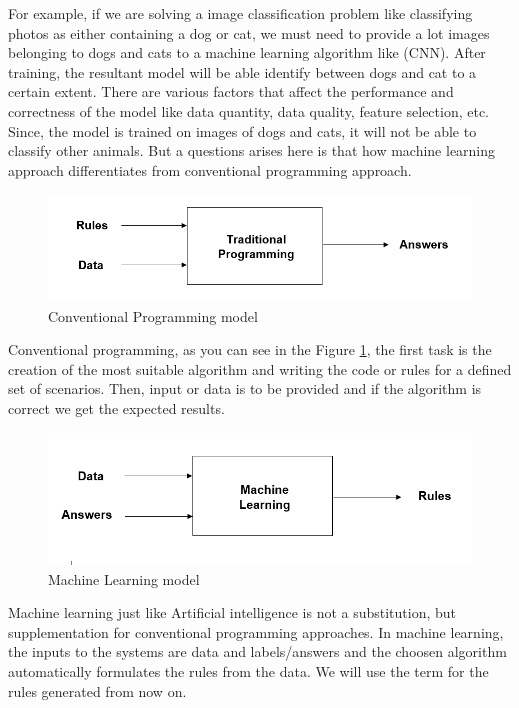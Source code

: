 For example, if we are solving a image classification problem like classifying photos as either containing a dog or cat, we must need to provide a lot images belonging to dogs and cats to a machine learning algorithm like (CNN). After training, the resultant model will be able identify between dogs and cat to a certain extent. There are various factors that affect the performance and correctness of the model like data quantity, data quality, feature selection, etc. Since, the model is trained on images of dogs and cats, it will not be able to classify other animals. But a questions arises here is that how machine learning approach differentiates from conventional programming approach.

\begin{figure}[H]
\centering
\includegraphics[scale=0.7]{images/Chapter2/TP.PNG}
\caption{Conventional Programming model}
\label{tp-model}
\end{figure}
\par

Conventional programming, as you can see in the Figure \ref{tp-model}, the first task is the creation of the most suitable algorithm and writing the code or rules for a defined set of scenarios. Then, input or data is to be provided and if the algorithm is correct we get the expected results.



\begin{figure}[H]
  \centering
  \includegraphics[scale=0.7]{images/Chapter2/ML.PNG}
  \caption{Machine Learning model}
  \label{mlp-model}
\end{figure}
\par
Machine learning just like Artificial intelligence is not a substitution, but supplementation for conventional programming approaches. In machine learning, the inputs to the systems are data and labels/answers and the choosen algorithm automatically formulates the rules from the data. We will use the term  for the rules generated from now on.


